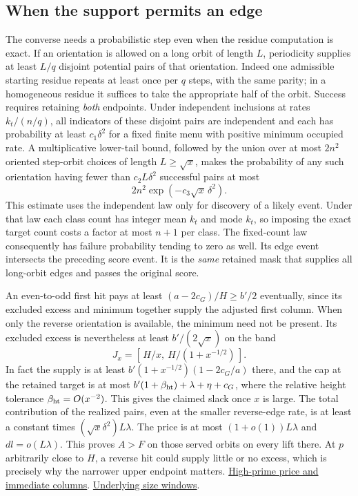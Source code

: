 \documentclass[12pt,letterpaper]{article}
\begin{document}
\subsection{When the support permits an edge}

The converse needs a probabilistic step even when the residue computation is exact. If an orientation is allowed on a long orbit of length \(L\), periodicity supplies at least \(L/q\) disjoint potential pairs of that orientation. Indeed one admissible starting residue repeats at least once per \(q\) steps, with the same parity; in a homogeneous residue it suffices to take the appropriate half of the orbit. Success requires retaining \emph{both} endpoints. Under independent inclusions at rates \(k_t/(n/q)\), all indicators of these disjoint pairs are independent and each has probability at least \(c_1\delta^2\) for a fixed finite menu with positive minimum occupied rate. A multiplicative lower-tail bound, followed by the union over at most \(2n^2\) oriented step-orbit choices of length \(L\ge\sqrt{x}\), makes the probability of any such orientation having fewer than \(c_2 L\delta^2\) successful pairs at most
\[
 2n^2\exp(-c_3\sqrt{x}\,\delta^2).
\]
This estimate uses the independent law only for discovery of a likely event. Under that law each class count has integer mean \(k_t\) and mode \(k_t\), so imposing the exact target count costs a factor at most \(n+1\) per class. The fixed-count law consequently has failure probability tending to zero as well. Its edge event intersects the preceding score event. It is the \emph{same} retained mask that supplies all long-orbit edges and passes the original score.

An even-to-odd first hit pays at least \((a-2c_G)/H\ge b'/2\) eventually, since its excluded excess and minimum together supply the adjusted first column. When only the reverse orientation is available, the minimum need not be present. Its excluded excess is nevertheless at least \(b'/(2\sqrt{x})\) on the band
\[
 J_x=\left[\,H/x,\ H/(1+x^{-1/2})\,\right].
\]
In fact the supply is at least \(b'(1+x^{-1/2})(1-2c_G/a)\) there, and the cap at the retained target is at most \(b'(1+\beta_{\rm ht})+\lambda+\eta+c_G\), where the relative height tolerance \(\beta_{\rm ht}=O(x^{-2})\). This gives the claimed slack once \(x\) is large. The total contribution of the realized pairs, even at the smaller reverse-edge rate, is at least a constant times \((\sqrt{x}\delta^2)L\lambda\). The price is at most \((1+o(1))L\lambda\) and \(dl=o(L\lambda)\). This proves \(A>F\) on those served orbits on every lift there. At \(p\) arbitrarily close to \(H\), a reverse hit could supply little or no excess, which is precisely why the narrower upper endpoint matters.
\href{https://github.com/nousentllc/riemann-hypothesis/blob/40e56bab026552e089d7afcfeff08d2defb9c005/src/Formalism/SharpRestriction/GrowthBounds/LogarithmicSums/PartnerCountOfCentral.lean#L769-L828}{High-prime price and immediate columns}.
\href{https://github.com/nousentllc/riemann-hypothesis/blob/40e56bab026552e089d7afcfeff08d2defb9c005/src/Formalism/SizeWindowBrackets/WindowSettingSatisfiable.lean#L65-L117}{Underlying size windows}.
\end{document}
